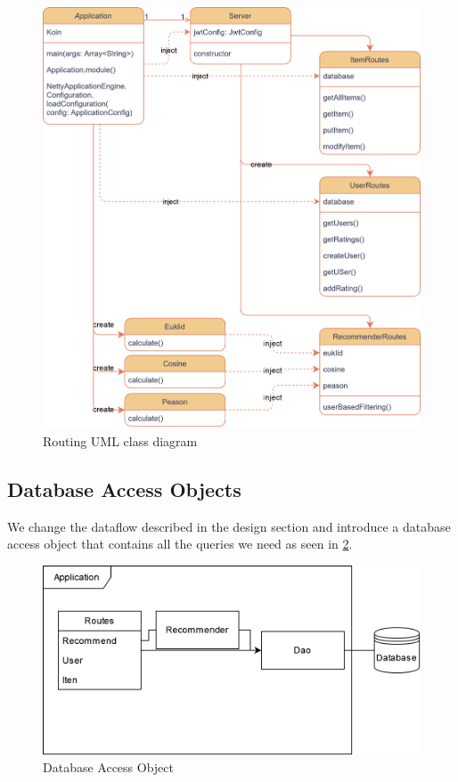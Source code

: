 \begin{figure}[ht]
\centering
\includegraphics[width=\textwidth]{images/RoutingUML.png}
\caption{\label{fig:routing}Routing UML class diagram}
\end{figure}


\subsection{Database Access Objects}

We change the dataflow described in the design section and introduce a database access object that contains all the queries we need as seen in \ref{fig:dao_vis}.

\begin{figure}[ht]
\centering
\includegraphics[width=\textwidth]{images/dao_visualizer.png}
\caption{\label{fig:dao_vis}Database Access Object}
\end{figure}

